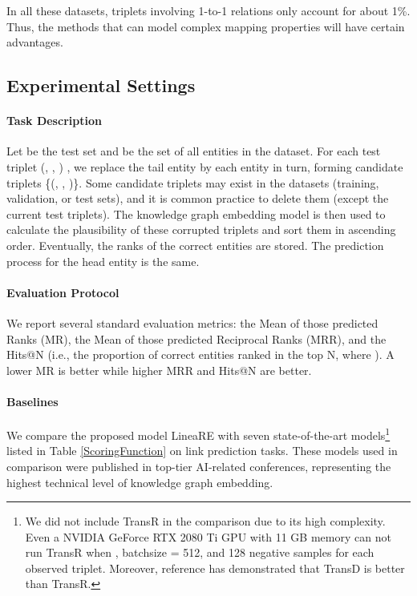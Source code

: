 \documentclass[conference]{IEEEtran}
\begin{document}
In all these datasets, triplets involving 1-to-1 relations only account for about 1\%. Thus, the methods that can model complex mapping properties will have certain advantages.

\subsection{Experimental Settings}
\paragraph*{Task Description}
Let  be the test set and  be the set of all entities in the dataset. For each test triplet (, , ) , we replace the tail entity  by each entity  in turn, forming candidate triplets \{(, , )\}. Some candidate triplets may exist in the datasets (training, validation, or test sets), and it is common practice to delete them (except the current test triplets). The knowledge graph embedding model is then used to calculate the plausibility of these corrupted triplets and sort them in ascending order. Eventually, the ranks of the correct entities are stored. The prediction process for the head entity is the same.

\paragraph*{Evaluation Protocol}
We report several standard evaluation metrics: the Mean of those predicted Ranks (MR), the Mean of those predicted Reciprocal Ranks (MRR), and the Hits@N (i.e., the proportion of correct entities ranked in the top N, where ). A lower MR is better while higher MRR and Hits@N are better.

\paragraph*{Baselines}
We compare the proposed model LineaRE with seven state-of-the-art models\footnote{
	We did not include TransR in the comparison due to its high complexity. Even a NVIDIA GeForce RTX 2080 Ti GPU with 11 GB memory can not run TransR when , batchsize = 512, and 128 negative samples for each observed triplet. Moreover, reference \cite{TransD} has demonstrated that TransD is better than TransR.
} listed in Table \ref{ScoringFunction} on link prediction tasks. These models used in comparison were published in top-tier AI-related conferences, representing the highest technical level of knowledge graph embedding.
\end{document}
